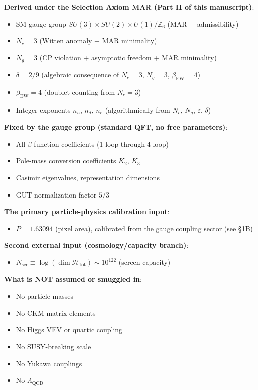 \textbf{Derived under the Selection Axiom MAR (Part II of this manuscript)}:

\begin{itemize}
\tightlist
\item
  SM gauge group \(SU(3) \times SU(2) \times U(1)/\mathbb{Z}_6\) (MAR + admissibility)
\item
  \(N_c = 3\) (Witten anomaly + MAR minimality)
\item
  \(N_g = 3\) (CP violation + asymptotic freedom + MAR minimality)
\item
  \(\delta = 2/9\) (algebraic consequence of \(N_c = 3\), \(N_g = 3\), \(\beta_{\text{EW}} = 4\))
\item
  \(\beta_{\text{EW}} = 4\) (doublet counting from \(N_c = 3\))
\item
  Integer exponents \(n_u\), \(n_d\), \(n_e\) (algorithmically from \(N_c\), \(N_g\), \(\varepsilon\), \(\delta\))
\end{itemize}

\textbf{Fixed by the gauge group (standard QFT, no free parameters)}:

\begin{itemize}
\tightlist
\item
  All \(\beta\)-function coefficients (1-loop through 4-loop)
\item
  Pole-mass conversion coefficients \(K_2\), \(K_3\)
\item
  Casimir eigenvalues, representation dimensions
\item
  GUT normalization factor \(5/3\)
\end{itemize}

\textbf{The primary particle-physics calibration input}:

\begin{itemize}
\tightlist
\item
  \(P = 1.63094\) (pixel area), calibrated from the gauge coupling sector (see \S{}1B)
\end{itemize}

\textbf{Second external input (cosmology/capacity branch)}:

\begin{itemize}
\tightlist
\item
  \(N_{\mathrm{scr}} \equiv \log(\dim\mathcal{H}_{\text{tot}}) \sim 10^{122}\) (screen capacity)
\end{itemize}

\textbf{What is NOT assumed or smuggled in}:

\begin{itemize}
\tightlist
\item
  No particle masses
\item
  No CKM matrix elements
\item
  No Higgs VEV or quartic coupling
\item
  No SUSY-breaking scale
\item
  No Yukawa couplings
\item
  No \(\Lambda_{\text{QCD}}\)
\end{itemize}

